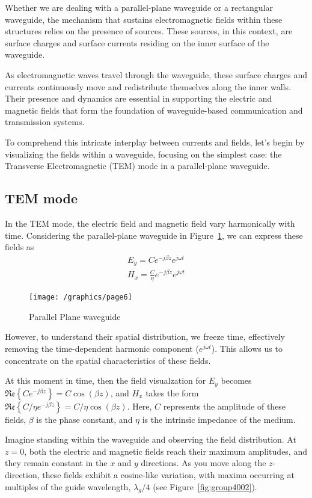 Whether we are dealing with a parallel-plane waveguide or a rectangular waveguide, the mechanism that sustains electromagnetic fields within these structures relies on the presence of sources. These sources, in this context, are surface charges and surface currents residing on the inner surface of the waveguide.

As electromagnetic waves travel through the waveguide, these surface charges and currents continuously move and redistribute themselves along the inner walls. Their presence and dynamics are essential in supporting the electric and magnetic fields that form the foundation of waveguide-based communication and transmission systems.

To comprehend this intricate interplay between currents and fields, let's begin by visualizing the fields within a waveguide, focusing on the simplest case: the Transverse Electromagnetic (TEM) mode in a parallel-plane waveguide.

\subsection{TEM mode}
In the TEM mode, the electric field and magnetic field vary harmonically with time. Considering the parallel-plane waveguide in Figure~\ref{fig:page6}, we can express these fields as
\begin{align*}
E_y = Ce^{-j\beta z}e^{j\omega t}\\
H_x = {\frac{C}{\eta}}e^{-j\beta z} e^{j\omega t}
\end{align*}
\begin{figure}[h]
\centering
\texttt{[image: /graphics/page6]}
\caption{Parallel Plane waveguide}
\label{fig:page6}
\end{figure}

However, to understand their spatial distribution, we freeze time, effectively removing the time-dependent harmonic component (\(e^{j\omega t}\)). This allows us to concentrate on the spatial characteristics of these fields.

At this moment in time, then the field visualzation for \(E_y\) becomes \({\mathfrak{Re}\left\{Ce^{-j\beta z}\right\}}= C \cos(\beta z)\), and \(H_x\) takes the form \({\mathfrak{Re}\left\{C/\eta e^{-j\beta z}\right\}} = C/\eta \cos(\beta z)\). Here, \(C\) represents the amplitude of these fields, \(\beta\) is the phase constant, and \(\eta\) is the intrinsic impedance of the medium.

Imagine standing within the waveguide and observing the field distribution. At \(z = 0\), both the electric and magnetic fields reach their maximum amplitudes, and they remain constant in the \(x\) and \(y\) directions. As you move along the \(z\)-direction, these fields exhibit a cosine-like variation, with maxima occurring at multiples of the guide wavelength, \(\lambda_g/4\) (see Figure~\ref{fig:group4002}).

